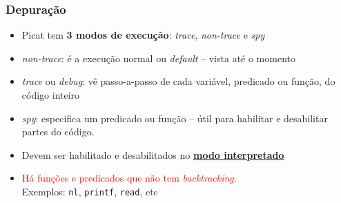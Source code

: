 \begin{frame}[fragile]

    \frametitle{Depuração}

    \begin{itemize}
    
      \item Picat tem \textbf{3 modos de execução}: \textit{trace},
      \textit{non-trace} e \textit{spy}
      \pause
      \item  \textit{non-trace}: é a execução normal ou \textit{default} -- vista até o momento

      \pause
      \item  \textit{trace} ou \textit{debug}: vê passo-a-passo de cada variável, predicado ou      função,  do código inteiro
      \pause
      \item \textit{spy}: especifica um predicado ou função -- útil para habilitar e desabilitar   partes do código.

      \pause
      \item Devem ser habilitado e desabilitados no \underline{\textbf{modo interpretado}}
    
      \item \textcolor{red}{Há funções e predicados que não tem \textit{backtracking}.}\\
      \pause
       Exemplos: \texttt{nl}, \texttt{printf}, \texttt{read}, etc
       
    \end{itemize}
\end{frame}


